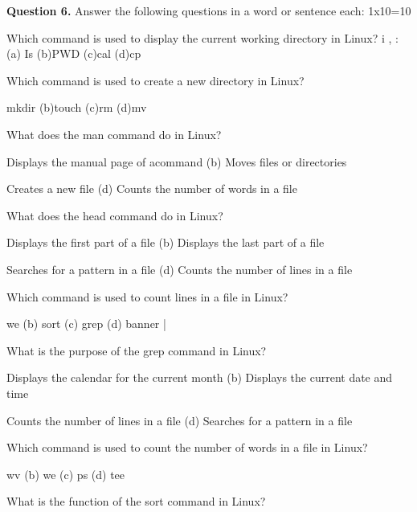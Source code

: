 \documentclass[11pt,a4paper]{article}
\begin{document}
\medskip\noindent\textbf{Question 6.} Answer the following questions in a word or sentence each: 1x10=10
\begin{parts}
  \item Which command is used to display the current working directory in Linux? i ,
  : (a) Is (b)PWD (c)cal (d)cp
  \begin{parts}
    \item Which command is used to create a new directory in Linux?
  \end{parts}
  \item mkdir (b)touch (c)rm  (d)mv
  \begin{parts}
    \item What does the man command do in Linux?
  \end{parts}
  \item Displays the manual page of acommand (b) Moves files or directories
  \item Creates a new file (d) Counts the number of words in a file
  \begin{parts}
    \item What does the head command do in Linux?
  \end{parts}
  \item Displays the first part of a file (b) Displays the last part of a file
  \item Searches for a pattern in a file (d) Counts the number of lines in a file
  \begin{parts}
    \item Which command is used to count lines in a file in Linux?
  \end{parts}
  \item we (b) sort (c) grep (d) banner |
  \begin{parts}
    \item What is the purpose of the grep command in Linux?
  \end{parts}
  \item Displays the calendar for the current month (b) Displays the current date and time
  \item Counts the number of lines in a file (d) Searches for a pattern in a file
  \begin{parts}
    \item Which command is used to count the number of words in a file in Linux?
  \end{parts}
  \item wv (b) we (c) ps (d) tee
  \begin{parts}
    \item What is the function of the sort command in Linux?

\end{parts}
\end{parts}
\end{document}
